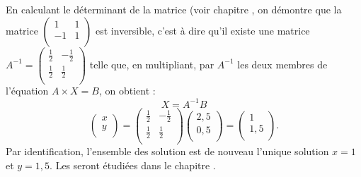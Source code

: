 \documentclass{book}
\begin{document}
En calculant le déterminant de la matrice (voir chapitre , on démontre que la matrice  $\begin{pmatrix}
 1 & 1   \\
 -1 & 1  \\
\end{pmatrix}$ est inversible, c'est à dire qu'il existe une matrice $A^{-1}=\begin{pmatrix}
 \frac 1 2 & -\frac 1 2   \\
 \frac 1 2 & \frac 1 2  \\
\end{pmatrix}$  telle que, en multipliant, par $A^{-1}$ les deux membres de l'équation $A\times X =B$, on obtient :
$$ X=A^{-1}B$$
$$ \begin{pmatrix}
 x   \\
 y  \\
\end{pmatrix}=\begin{pmatrix}
 \frac 1 2 & -\frac 1 2   \\
 \frac 1 2 & \frac 1 2  \\
\end{pmatrix} \begin{pmatrix}
 2,5   \\
 0,5  \\
\end{pmatrix}= \begin{pmatrix}
 1  \\
 1,5  \\
\end{pmatrix}.$$ 
Par identification, l'ensemble des solution est de nouveau l'unique solution $x=1$ et $y=1,5$. 
Les seront étudiées dans le chapitre . 
\end{document}

